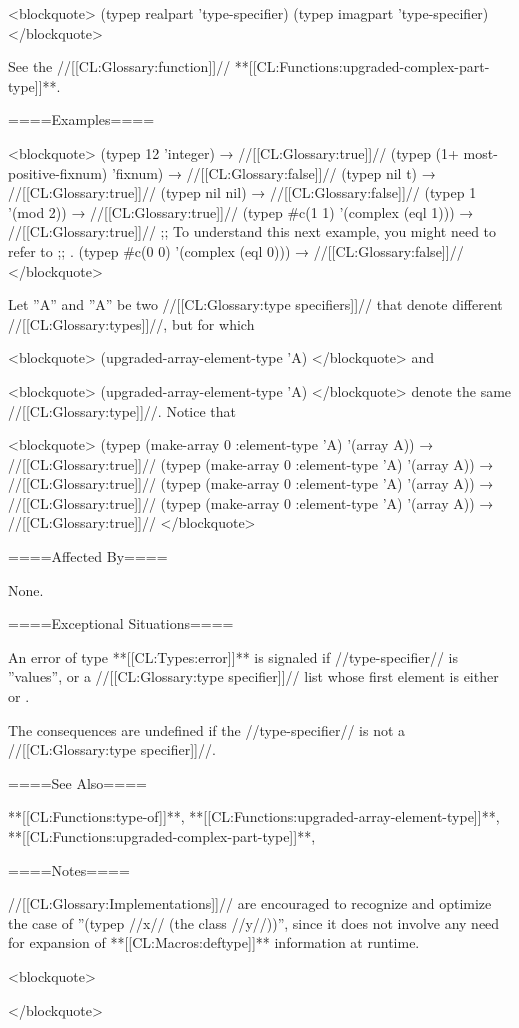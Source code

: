 <blockquote> (typep realpart 'type-specifier) (typep imagpart 'type-specifier) </blockquote>

See the //[[CL:Glossary:function]]// **[[CL:Functions:upgraded-complex-part-type]]**.

====Examples====

<blockquote> (typep 12 'integer) → //[[CL:Glossary:true]]// (typep (1+ most-positive-fixnum) 'fixnum) → //[[CL:Glossary:false]]// (typep nil t) → //[[CL:Glossary:true]]// (typep nil nil) → //[[CL:Glossary:false]]// (typep 1 '(mod 2)) → //[[CL:Glossary:true]]// (typep #c(1 1) '(complex (eql 1))) → //[[CL:Glossary:true]]// ;; To understand this next example, you might need to refer to ;; \secref\RuleOfCanonRepForComplexRationals. (typep #c(0 0) '(complex (eql 0))) → //[[CL:Glossary:false]]// </blockquote>

Let ''A\sssx'' and ''A\sssy'' be two //[[CL:Glossary:type specifiers]]// that denote different //[[CL:Glossary:types]]//, but for which

<blockquote> (upgraded-array-element-type 'A\sssx) </blockquote> and

<blockquote> (upgraded-array-element-type 'A\sssy) </blockquote> denote the same //[[CL:Glossary:type]]//. Notice that

<blockquote> (typep (make-array 0 :element-type 'A\sssx) '(array A\sssx)) → //[[CL:Glossary:true]]// (typep (make-array 0 :element-type 'A\sssy) '(array A\sssy)) → //[[CL:Glossary:true]]// (typep (make-array 0 :element-type 'A\sssx) '(array A\sssy)) → //[[CL:Glossary:true]]// (typep (make-array 0 :element-type 'A\sssy) '(array A\sssx)) → //[[CL:Glossary:true]]// </blockquote>


====Affected By====

None.

====Exceptional Situations====

An error of type **[[CL:Types:error]]** is signaled if //type-specifier// is ''values'', or a //[[CL:Glossary:type specifier]]// list whose first element is either  or .

The consequences are undefined if the //type-specifier// is not a //[[CL:Glossary:type specifier]]//.

====See Also====

**[[CL:Functions:type-of]]**, **[[CL:Functions:upgraded-array-element-type]]**, **[[CL:Functions:upgraded-complex-part-type]]**, {\secref\TypeSpecifiers}

====Notes====

//[[CL:Glossary:Implementations]]// are encouraged to recognize and optimize the case of ''(typep //x// (the class //y//))'', since it does not involve any need for expansion of **[[CL:Macros:deftype]]** information at runtime.

<blockquote>

</blockquote>

   
